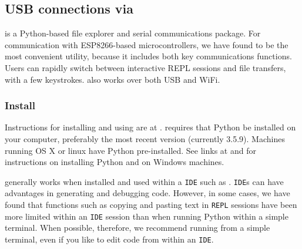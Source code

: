 \subsection{USB connections via \mpfshell}
\mpfshell is a Python-based file explorer and serial communications package. 
For communication with ESP8266-based microcontrollers, we have found \mpfshell to be the most convenient utility, because it includes both key communications functions.
Users can rapidly switch between interactive REPL sessions and file transfers, with a few keystrokes.
\mpfshell also works over both USB and WiFi.

\subsubsection{\howto Install \mpfshell}

Instructions for installing and using \mpfshell are at . 
\mpfshell requires that Python be installed on your computer, preferably the most recent version (currently 3.5.9). 
Machines running OS X or linux have Python pre-installed. 
See links at  and  for instructions on installing Python and \mpfshell on Windows machines.
\begin{kaobox}[frametitle=Using \mpfshell in \htmladdnormallink{Integrated Development Environments}{https://en.wikipedia.org/wiki/Integrated_development_environment}  (\texttt{IDE}s)]
	\mpfshell generally works when installed and used within a \python \texttt{IDE} such as . 
	\python \texttt{IDE}s can have advantages in generating and debugging code. 
	However, in some cases, we have found that functions such as copying and pasting text in \texttt{REPL} sessions have been more limited within an \texttt{IDE} session than when running Python within a simple terminal. 
	When possible, therefore, we recommend running \mpfshell from a simple terminal, even if you like to edit code from within an \texttt{IDE}. 
\end{kaobox}

